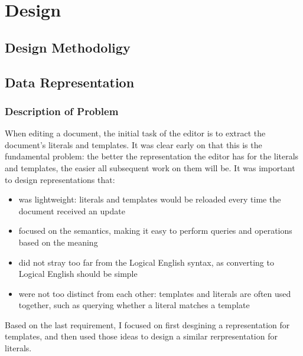 \documentclass[../main.tex]{subfiles}
\begin{document}
\chapter{Design}
\section{Design Methodoligy}
%
%
%
\section{Data Representation}
\subsection{Description of Problem}
When editing a document, the initial task of the editor is to extract the document's literals and templates. It was clear early on that this is the fundamental problem: the better the representation the editor has for the literals and templates, the easier all subsequent work on them will be. It was important to design representations that:
\begin{itemize}
    \item was lightweight: literals and templates would be reloaded every time the document received an update
    \item focused on the semantics, making it easy to perform queries and operations based on the meaning
    \item did not stray too far from the Logical English syntax, as converting to Logical English should be simple
    \item were not too distinct from each other: templates and literals are often used together, such as querying whether a literal matches a template
\end{itemize}
Based on the last requirement, I focused on first desgining a representation for templates, and then used those ideas to design a similar rerpresentation for literals. 
\end{document}
